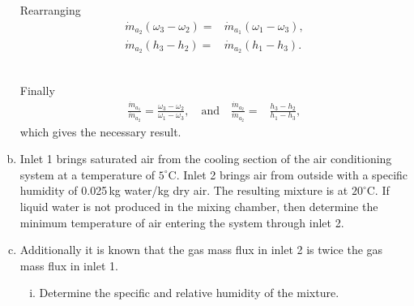 \documentclass[calculator,datasheet,resit]{exam}
\begin{document}
\begin{question}
\begin{enumerate}[(a)]
{Rearranging
\begin{align*}
 \dot{m}_{a_2} \left(\omega_3 - \omega_2\right) =& \dot{m}_{a_1} \left(\omega_1 - \omega_3\right), \\
 \dot{m}_{a_2} \left(h_3 - h_2\right) =& \dot{m}_{a_2} \left(h_1 - h_3\right).
\end{align*}~

Finally
\begin{align*}
 \frac{\dot{m}_{a_1}}{\dot{m}_{a_2}} = \frac{\omega_3 - \omega_2}{\omega_1 - \omega_3}, \quad \mbox{and} \quad \frac{\dot{m}_{a_2}}{\dot{m}_{a_2}} =& \frac{h_3 - h_2}{h_1 - h_3},
\end{align*}
which gives the necessary result.
}

\item Inlet 1 brings saturated air from the cooling section of the air conditioning system at a temperature of $5^\circ$C. Inlet 2 brings air from outside with a specific humidity of 0.025\,kg water/kg dry air. The resulting mixture is at $20^\circ$C. If liquid water is not produced in the mixing chamber, then determine the minimum temperature of air entering the system through inlet 2. 

\item Additionally it is known that the gas mass flux in inlet 2 is twice the gas mass flux in inlet 1.
\begin{enumerate}[(i)]
\item Determine the specific and relative humidity of the mixture. 
\end{enumerate}
\end{enumerate}
\end{question}
\end{document}
